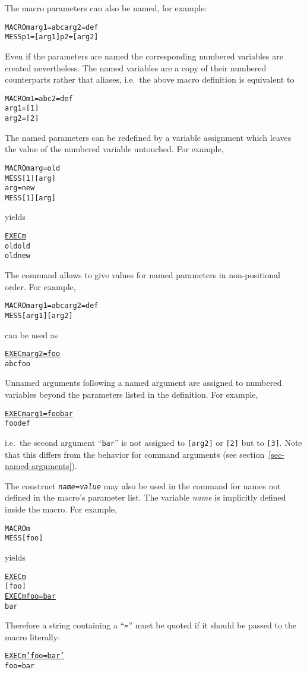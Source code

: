 The macro parameters can also be named, for example:
\begin{alltt}
MACRO m arg1=abc arg2=def
MESS p1=[arg1] p2=[arg2]
\end{alltt}
Even if the parameters are named the corresponding numbered variables
are created nevertheless.
The named variables are a copy of their numbered counterparts rather
that aliases, i.e.\ the above macro definition is equivalent to
\begin{alltt}
MACRO m 1=abc 2=def
arg1 = [1]
arg2 = [2]
\end{alltt}
The named parameters can be redefined by a variable assignment which
leaves the value of the numbered variable untouched.
For example,
\begin{alltt}
MACRO m arg=old
MESS [1] [arg]
arg = new
MESS [1] [arg]
\end{alltt}
yields
\begin{alltt}
\PROMPT{} \underline{EXEC m}
 old old
 old new
\end{alltt}

The  command allows to give values for named parameters in
non-positional order.
For example,
\begin{alltt}
MACRO m arg1=abc arg2=def
MESS [arg1] [arg2]
\end{alltt}
can be used as
\begin{alltt}
\PROMPT{} \underline{EXEC m arg2=foo}
 abc foo
\end{alltt}

Unnamed  arguments following a named argument are assigned
to numbered variables beyond the parameters listed in the 
definition.
For example,
\begin{alltt}
\PROMPT{} \underline{EXEC m arg1=foo bar}
 foo def
\end{alltt}
i.e.\ the second argument ``\texttt{bar}'' is not assigned to \texttt{[arg2]}
or \texttt{[2]} but to \texttt{[3]}.
Note that this differs from the behavior for command arguments (see
section~\ref{sec-named-arguments}). 

The construct \texttt{\textsl{name}=\textsl{value}} may also be used in
the  command for names not defined in the macro's parameter list.
The variable \textsl{name} is implicitly defined inside the macro.
For example,
\begin{alltt}
MACRO m
MESS [foo]
\end{alltt}
yields
\begin{alltt}
\PROMPT{} \underline{EXEC m}
 [foo]
\PROMPT{} \underline{EXEC m foo=bar}
 bar
\end{alltt}
Therefore a string containing a ``\texttt{=}'' must be
quoted
if it should be
passed to the macro literally:
\begin{alltt}
\PROMPT{} \underline{EXEC m 'foo=bar'}
 foo=bar
\end{alltt}

